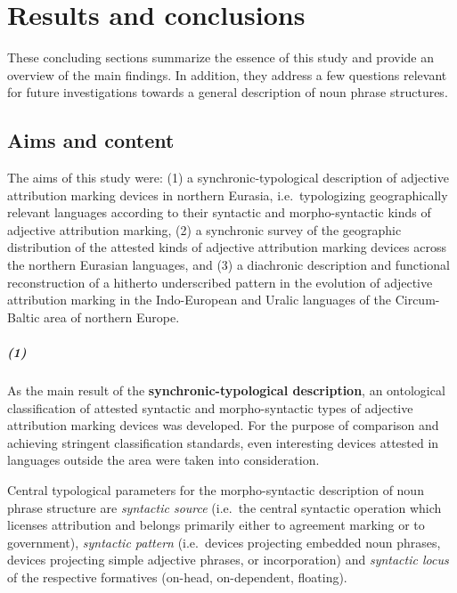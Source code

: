 
\chapter{Results and conclusions}
These concluding sections summarize the essence of this study and provide an overview of the main findings. In addition, they address a few questions relevant for future investigations towards a general description of noun phrase structures.

\section{Aims and content}
The aims of this study were: (1) a synchronic-typological description of adjective attribution marking devices in northern Eurasia, i.e.~typologizing geographically relevant languages according to their syntactic and morpho-syntactic kinds of adjective attribution marking, (2) a synchronic survey of the geographic distribution of the attested kinds of adjective attribution marking devices across the northern Eurasian languages, and (3) a diachronic description and functional reconstruction of a hitherto underscribed pattern in the evolution of adjective attribution marking in the Indo-European and Uralic languages of the Circum-Baltic area of northern Europe.

\paragraph{(1)}
As the main result of the \textbf{synchronic-typological description}, an ontological classification of attested syntactic and morpho-syntactic types of adjective attribution marking devices was developed. For the purpose of comparison and achieving stringent classification standards, even interesting devices attested in languages outside the area were taken into consideration. 

Central typological parameters for the morpho-syntactic description of noun phrase structure are \textit{syntactic source} (i.e.~the central syntactic operation which licenses attribution and belongs primarily either to agreement marking or to government), \textit{syntactic pattern} (i.e.~devices projecting embedded noun phrases, devices projecting simple adjective phrases, or incorporation) and \textit{syntactic locus} of the respective formatives (on-head, on-dependent, floating).

